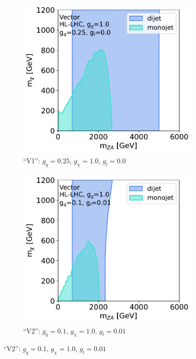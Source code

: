 \documentclass[11pt]{article}
\begin{document}
\begin{figure}
     \centering
     \begin{subfigure}[b]{0.49\textwidth}
         \centering
         \includegraphics[width=\textwidth]{SummaryPlots-EF10/figures/massmass/hl-lhc/massmass_vector_gq0.25_gdm1.0_gl0.0.pdf}
         \caption{``V1'': $g_q=0.25$, $g_{\chi}=1.0$, $g_l=0.0$}
         \label{subfig:vector-hl-lhc-v1}
     \end{subfigure}
     \hfill
     \begin{subfigure}[b]{0.49\textwidth}
         \centering
         \includegraphics[width=\textwidth]{SummaryPlots-EF10/figures/massmass/hl-lhc/massmass_vector_gq0.1_gdm1.0_gl0.01.pdf}
         \caption{``V2'': $g_q=0.1$, $g_{\chi}=1.0$, $g_l=0.01$}
         \label{subfig:vector-hl-lhc-v2}
     \end{subfigure}


\end{figure}
\end{document}

